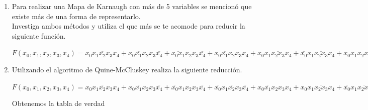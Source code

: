 \documentclass[a4paper,12pt]{article}
\begin{document}
\begin{enumerate}[label=\textcolor{teal}{\textbf{\arabic*.}}]
    \item Para realizar una Mapa de Karnaugh con más de 5 variables se mencionó que existe más de
    una forma de representarlo.\\
    Investiga ambos métodos y utiliza el que más se te acomode para reducir la siguiente función.

    \begin{center}
        $F(x_0,x_1,x_2,x_3,x_4) = 
        \overline{x_0 x_1 x_2 x_3 x_4} 
        + \overline{x_0 x_1 x_2} x_3 \overline{x_4} 
        + \overline{x_0 x_1} x_2 x_3 \overline{x_4} 
        + x_0 \overline{x_1} x_2 x_3 x_4
        + x_0 x_1 \overline{x_2 x_3} x_4
        + \overline{x_0} x_1 \overline{x_2 x_3} x_4
        + x_0 x_1 x_2 x_3 x_4 
        $
    \end{center}
   
    \item Utilizando el algoritmo de Quine-McCluskey realiza la siguiente reducción.

        \begin{center}
            $F(x_0,x_1,x_2,x_3,x_4) = 
            \overline{x_0 x_1 x_2 x_3 x_4} 
            + \overline{x_0 x_1 x_2} x_3 \overline{x_4} 
            + \overline{x_0} x_1 x_2 x_3 \overline{x_4}   
            + \overline{x_0} x_1 \overline{x_2} x_3 \overline{x_4}  
            + x_0 \overline{x_1} x_2 x_3 x_4    
            + x_0 x_1 \overline{ x_2 x_3} x_4 
            + \overline{x_0} x_1 \overline{ x_2 x_3} x_4 
            + x_0 x_1 x_2 \overline{ x_3} x_4 
            + x_0 x_1 x_2 x_3 x_4 
             $
        \end{center}

        Obtenemos la tabla de verdad


\end{enumerate}
\end{document}
